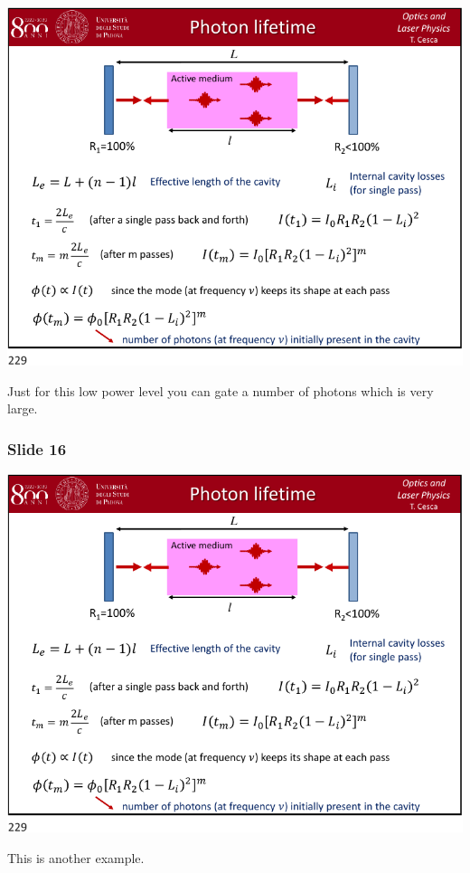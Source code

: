\documentclass[../main/main.tex]{subfiles}
\begin{document}
\begin{minipage}[]{0.5\linewidth}
\centering
\includegraphics[page=15,width=1\textwidth]{../lessons/pdf_file/12_lecture.pdf}
\end{minipage}
\hspace{0.3cm}\vspace{0.3cm}
\begin{minipage}[c]{0.47\linewidth}

Just for this low power level you can gate a number of photons which is very large.

\end{minipage}

\subsubsection*{Slide 16}

\begin{minipage}[]{0.5\linewidth}
\centering
\includegraphics[page=16,width=1\textwidth]{../lessons/pdf_file/12_lecture.pdf}
\end{minipage}
\hspace{0.3cm}\vspace{0.3cm}
\begin{minipage}[c]{0.47\linewidth}

This is another example.

\end{minipage}
\end{document}
